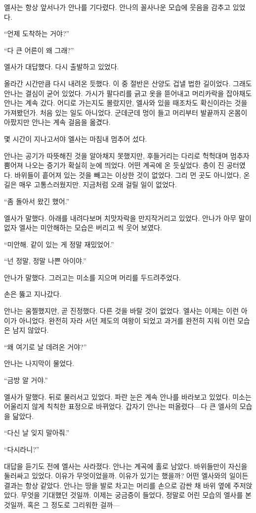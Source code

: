 엘사는 항상 앞서나가 안나를 기다렸다. 안나의 꼴사나운 모습에 웃음을 감추고 있었다.

``언제 도착하는 거야?''

``다 큰 어른이 왜 그래?''

엘사가 대답했다. 다시 출발하고 있었다.

올라간 시간만큼 다시 내려온 듯했다. 이 중 절반은 산양도 겁낼 법한 길이었다. 그래도 안나는 결심이 굳어 있었다. 가시가 팔다리를 긁고 옷을 뜯어내고 머리카락을 잡아채도 안나는 계속 갔다. 어디로 가는지도 몰랐지만, 엘사와 있을 때조차도 확신이라는 것을 가져봤던가. 처음 있는 일도 아니었다. 군데군데 멍이 들고 머리부터 발끝까지 온몸이 아팠지만 안나는 계속 걸음을 옮겼다.

몇 시간이 지나고서야 엘사는 마침내 멈추어 섰다.

안나는 공기가 따뜻해진 것을 알아채지 못했지만, 후들거리는 다리로 헉헉대며 멈추자 뿜어져 나오는 증기가 확실히 눈에 띄었다. 어떤 계곡에 온 듯싶었다. 층이 진 공터였다. 바위들이 흩어져 있는 것을 빼고는 이상한 것이 없었다. 그리 먼 곳도 아니었다, 온 길은 매우 고통스러웠지만. 지금처럼 오래 걸릴 일이 없었다.

``좀 돌아서 왔긴 했어.''

엘사가 말했다. 아래를 내려다보며 치맛자락을 만지작거리고 있었다. 안나가 아무 말이 없자 엘사는 미안해하는 모습은 버리고 씩 웃어 보였다.

``미안해. 같이 있는 게 정말 재밌었어.''

``넌 정말, 정말 나쁜 아이야.''

안나가 말했다. 그러고는 미소를 지으며 머리를 두드려주었다.

손은 뚫고 지나갔다.

안나는 움찔했지만, 곧 진정했다. 다른 것을 바랄 것이 없었다. 엘사는 이제는 이런 아이가 아니었다. 완전히 자라 서던 제도의 여왕이 되었고 과거를 완전히 지워 이런 모습은 남지 않았다.

``왜 여기로 날 데려온 거야?''

안나는 나지막이 물었다.

``금방 알 거야.''

엘사가 말했다. 뒤로 물러서고 있었다. 파란 눈은 계속 안나를 바라보고 있었다. 미소는 어울리지 않게 칙칙한 표정으로 바뀌었다. 갑자기 안나는 떠올렸다—다 큰 엘사의 모습을 닮았다.

``다신 날 잊지 말아줘.''

``다시라니?''

대답을 듣기도 전에 엘사는 사라졌다. 안나는 계곡에 홀로 남았다. 바위들만이 자신을 둘러싸고 있었다. 이유가 무엇이었을까. 이유가 있기는 했을까? 어떤 엘사와의 일이든 결과는 항상 같았다. 안나는 땅을 발로 차고는 머리를 손으로 감싼 채 바위 옆에 주저앉았다. 무엇을 기대했던 것일까. 이제는 궁금증이 들었다, 정말로 어린 모습의 엘사를 본 것일까, 혹은 그 정도로 그리워한 걸까—

